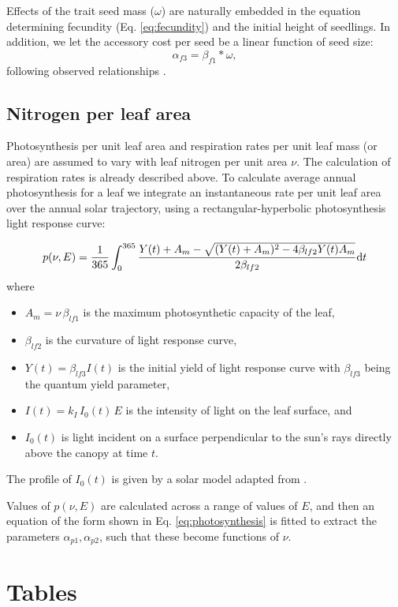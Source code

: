 \documentclass[10pt,twoside]{article}
\begin{document}
Effects of the trait seed mass ($\omega$) are naturally embedded in the equation determining
fecundity (Eq. \ref{eq:fecundity}) and the initial height of seedlings. In addition,
we let the accessory cost per seed be a linear function of seed size:
$$\alpha_{f3} = \beta_{f1} * \omega,$$
following observed relationships \citep{Henery-2001}.

\subsection{Nitrogen per leaf area}

Photosynthesis per unit leaf area and respiration rates per unit leaf mass (or area)
are assumed to vary with leaf nitrogen per unit area $\nu$. The calculation of respiration rates is already described above. To calculate average annual photosynthesis for a leaf
we integrate an instantaneous rate per unit leaf area over the annual solar trajectory,
using a rectangular-hyperbolic photosynthesis light response curve:

$$p(\nu, E) = \frac1{365}\int_0^{365 }\frac{Y(t) + A_m - \sqrt{(Y(t) + A_m)^2 - 4  \beta_{lf2} Y(t) A_m }}{2 \beta_{lf2}} {\rm d}t$$
where
\begin{itemize}
  \item $A_m = \nu \, \beta_{lf1}$ is the maximum photosynthetic capacity of the leaf,
  \item $\beta_{lf2}$ is the curvature of light response curve,
  \item $Y(t) = \beta_{lf3} I(t)$ is the initial yield of light response curve with $\beta_{lf3}$ being the quantum yield parameter,
  \item $I(t) = k_I \, I_0(t)\, E$ is the intensity of light on the leaf surface, and
  \item $I_0(t)$ is light incident on a surface perpendicular to the sun's rays directly above the canopy at time $t$.
\end{itemize}
The profile of $I_0(t)$ is given by a solar model adapted from \citet{TerSteege-1997}.

Values of $p(\nu, E)$ are calculated across a range of values of $E$, and then an equation of the form shown in Eq. \ref{eq:photosynthesis} is fitted to extract the parameters
$\alpha_{p1}, \alpha_{p2}$, such that these become functions of $\nu$.

\clearpage

\section{Tables}\label{tables}
\end{document}
